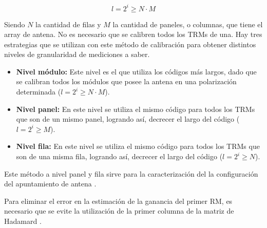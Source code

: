 \begin{equation}
	l = 2^i \ge N \cdot M
\end{equation}

Siendo $N$ la cantidad de filas y $M$ la cantidad de paneles, o columnas, que tiene el array de antena. No es necesario que 
se calibren todos los TRMs de una. Hay tres estrategias que se utilizan con este método de calibración para obtener 
distintos niveles de granularidad de mediciones a saber.

\begin{itemize}
	\item \textbf{Nivel módulo:} Este nivel es el que utiliza los códigos más largos, dado que se calibran todos los módulos que 
		posee la antena en una polarización determinada ($l = 2^i \ge N \cdot M$).
	\item \textbf{Nivel panel:} En este nivel se utiliza el mismo código para todos los TRMs que son de un mismo panel, 
		logrando así, decrecer el largo del código ($l = 2^i \ge M$).
	\item \textbf{Nivel fila:} En este nivel se utiliza el mismo código para todos los TRMs que son de una misma fila, 
		logrando así, decrecer el largo del código ($l = 2^i \ge N$).
\end{itemize}

Este método a nivel panel y fila sirve para la caracterización del la configuración del apuntamiento de antena \cite{Br2007}.



Para eliminar el error en la estimación de la ganancia del primer RM, es necesario que se evite la utilización de la 
primer columna de la matriz de Hadamard \cite{Wang2010}.

